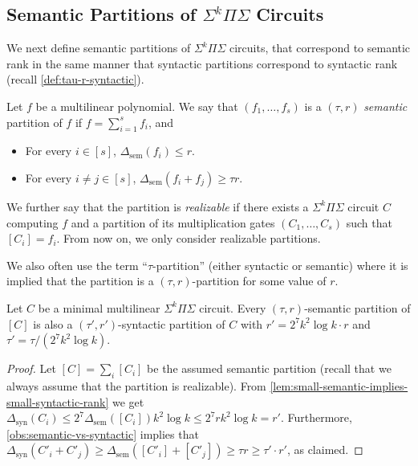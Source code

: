 \documentclass[12pt]{article}
\newcommand{\Sps}[1]{\Sigma^{#1} \Pi\Sigma}
\newcommand{\ranksyn}{\Delta_{\text{syn}}}
\newcommand{\ranksem}{\Delta_{\text{sem}}}
\begin{document}
		
	
	\subsection{Semantic Partitions of $\Sps{k}$ Circuits}\label{sec:sem-part}
	
	We next define semantic partitions of $\Sps{k}$ circuits, that correspond to semantic rank in the same manner that syntactic partitions correspond to syntactic rank (recall \autoref{def:tau-r-syntactic}).
	
	
	\begin{definition}
		\label{def:tau-r-semantic}
		Let $f$ be a multilinear polynomial.
		We say that $(f_1, \ldots, f_s)$ is a $(\tau,r)$ \emph{semantic} partition of $f$ if $f = \sum_{i=1}^s f_i$, and
		\begin{itemize}
			\item For every $i \in [s]$, $\ranksem(f_i) \le r$.
			\item For every $i \neq j \in [s]$, $\ranksem(f_i + f_j) \ge \tau r$.
		\end{itemize}
		We further say that the partition is \emph{realizable} if there exists a $\Sps{k}$ circuit $C$ computing $f$ and a partition of its multiplication gates $(C_1, \ldots, C_s)$ such that $[C_i] = f_i$. From now on, we only consider realizable partitions.
	\end{definition}
	
	We also often use the term ``$\tau$-partition'' (either syntactic or semantic) where  it is implied that the partition is a $(\tau,r)$-partition for some value of $r$.
	
	\begin{corollary}\label{cor:sem-is-syn}
		Let $C$ be a minimal multilinear $\Sps{k}$ circuit.
		Every $(\tau,r)$-semantic partition of $[C]$ is also a $(\tau',r')$-syntactic partition of $C$ with $r'=2^7 k^2 \log k \cdot r $ and $\tau'=\tau/(2^7 k^2 \log k)$.
	\end{corollary}
	\begin{proof}
		Let $[C]=\sum_i [C_i]$ be the assumed semantic partition (recall that we always assume that the partition is realizable). From \autoref{lem:small-semantic-implies-small-syntactic-rank} we get $\ranksyn(C_i)\leq 2^7 \ranksem([C_i]) k^2 \log k \leq  2^7 r k^2 \log k=r'$.  Furthermore, \autoref{obs:semantic-vs-syntactic} implies that $\ranksyn(C'_i + C'_j)\geq \ranksem([C'_i] + [C'_j])\geq  \tau r \ge \tau'\cdot r'$, as claimed. 
	\end{proof}
	
\end{document}
